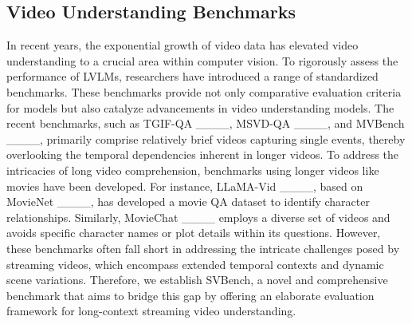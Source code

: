 \subsection{Video Understanding Benchmarks}
In recent years, the exponential growth of video data has elevated video understanding to a crucial area within computer vision.
%
To rigorously assess the performance of LVLMs, researchers have introduced a range of standardized benchmarks. 
%
These benchmarks provide not only comparative evaluation criteria for models but also catalyze advancements in video understanding models. 
%
The recent benchmarks, such as TGIF-QA ____, MSVD-QA ____, and MVBench ____, primarily comprise relatively brief videos capturing single events, thereby overlooking the temporal dependencies inherent in longer videos. 
%
To address the intricacies of long video comprehension, benchmarks using longer videos like movies have been developed. 
%
For instance, LLaMA-Vid ____, based on MovieNet ____, has developed a movie QA dataset to identify character relationships.
%
Similarly, MovieChat ____ employs a diverse set of videos and avoids specific character names or plot details within its questions.
%
However, these benchmarks often fall short in addressing the intricate challenges posed by streaming videos, which encompass extended temporal contexts and dynamic scene variations. 
%
Therefore, we establish SVBench, a novel and comprehensive benchmark that aims to bridge this gap by offering an elaborate evaluation framework for long-context streaming video understanding.
%
